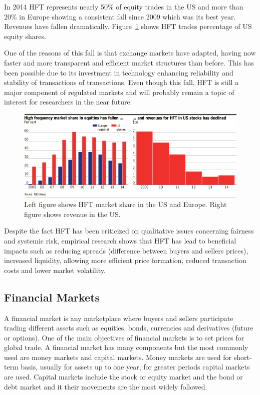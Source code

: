 In 2014 HFT represents nearly 50\% of equity trades in the US and more than 20\%
in Europe showing a consistent fall since 2009 which was its best year. Revenues
have fallen dramatically.
Figure~\ref{fig:HFTmarket} shows HFT trades percentage of US equity shares.


One of the reasons of this fall is that exchange markets have adapted, having
now faster and more transparent and efficient market structures than before.
This has been possible due to its investment in technology enhancing
reliability and stability of transactions of transactions.
Even though this fall, HFT is still a major component of regulated markets and
will probably remain a topic of interest for researchers in the near future.


\begin{figure}[!h]
  \centering
  \includegraphics[width=\textwidth]{img/HFTmarket}
  \caption{Left figure shows HFT market share in the US and Europe. Right figure
  shows revenue in the US.}
  \label{fig:HFTmarket}
\end{figure}

Despite the fact HFT has been criticized on qualitative issues concerning
fairness and systemic risk, empirical research shows that HFT has lead to
beneficial impacts such as reducing spreads (difference between buyers and
sellers prices), increased liquidity, allowing more efficient price formation,
reduced transaction costs and lower market volatility.


\subsection{Financial Markets}

A financial market is any marketplace where buyers and sellers participate
trading different assets such as equities, bonds, currencies and derivatives
(future or options). One of the main objectives of financial markets is to set
prices for global trade.
A financial market has many components but the most commonly used are money
markets and capital markets. Money markets are used for short-term basis,
usually for assets up to one year, for greater periods capital markets are used.
Capital markets include the stock or equity market and the bond or debt market
and it their movements are the most widely followed.



